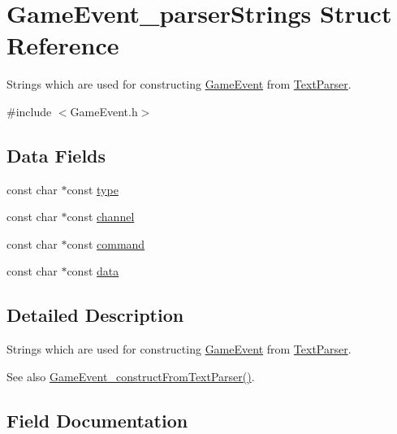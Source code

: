 \hypertarget{struct_game_event__parser_strings}{}\section{Game\+Event\+\_\+parser\+Strings Struct Reference}
\label{struct_game_event__parser_strings}


Strings which are used for constructing \hyperlink{struct_game_event}{Game\+Event} from \hyperlink{struct_text_parser}{Text\+Parser}.  




{\ttfamily \#include $<$Game\+Event.\+h$>$}

\subsection*{Data Fields}
\begin{DoxyCompactItemize}
\item 
const char $\ast$const \hyperlink{struct_game_event__parser_strings_a8ff938fb2f815be425fd2859a21e6d61}{type}
\item 
const char $\ast$const \hyperlink{struct_game_event__parser_strings_aac0fef3e3be17a5117b8e17ed55e33ec}{channel}
\item 
const char $\ast$const \hyperlink{struct_game_event__parser_strings_ac7eef288127bdf6b327ed1ff5c8ab5bb}{command}
\item 
const char $\ast$const \hyperlink{struct_game_event__parser_strings_ae62ff5b9a94eb24120cdac857594d217}{data}
\end{DoxyCompactItemize}


\subsection{Detailed Description}
Strings which are used for constructing \hyperlink{struct_game_event}{Game\+Event} from \hyperlink{struct_text_parser}{Text\+Parser}. 

\begin{DoxySeeAlso}{See also}
\hyperlink{_game_event_8h_a3356fae9b4882944feda139817e29f88}{Game\+Event\+\_\+construct\+From\+Text\+Parser()}. 
\end{DoxySeeAlso}


\subsection{Field Documentation}
\hypertarget{struct_game_event__parser_strings_aac0fef3e3be17a5117b8e17ed55e33ec}{}\label{struct_game_event__parser_strings_aac0fef3e3be17a5117b8e17ed55e33ec} 
